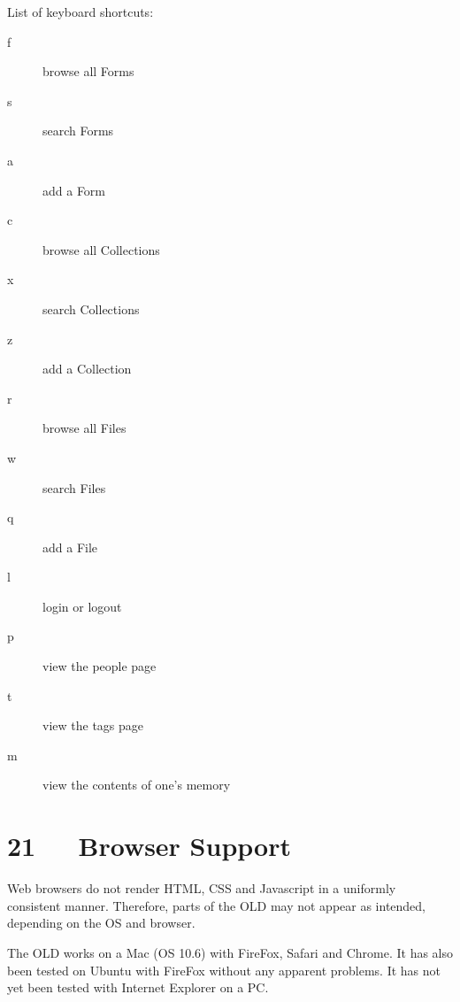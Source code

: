 \documentclass[letterpaper,10pt,english]{sphinxmanual}
\begin{document}
List of keyboard shortcuts:
\begin{description}
\item[{f}] \leavevmode
browse all Forms

\item[{s}] \leavevmode
search Forms

\item[{a}] \leavevmode
add a Form

\item[{c}] \leavevmode
browse all Collections

\item[{x}] \leavevmode
search Collections

\item[{z}] \leavevmode
add a Collection

\item[{r}] \leavevmode
browse all Files

\item[{w}] \leavevmode
search Files

\item[{q}] \leavevmode
add a File

\item[{l}] \leavevmode
login or logout

\item[{p}] \leavevmode
view the people page

\item[{t}] \leavevmode
view the tags page

\item[{m}] \leavevmode
view the contents of one's memory

\end{description}


\chapter{21   Browser Support}
\label{documentation:browser-support}
Web browsers do not render HTML, CSS and Javascript in a uniformly consistent
manner.  Therefore, parts of the OLD may not appear as intended, depending on
the OS and browser.

The OLD works on a Mac (OS 10.6) with FireFox, Safari and Chrome.  It has also
been tested on Ubuntu with FireFox without any apparent problems.  It has not
yet been tested with Internet Explorer on a PC.
\end{document}
